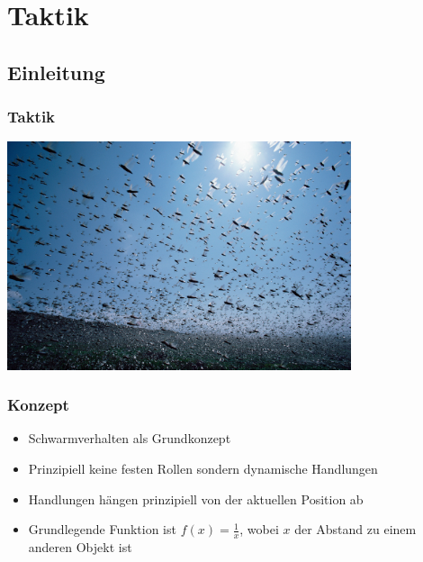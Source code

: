 \section{Taktik}
\begin{frame}
\tableofcontents[currentsection]
\end{frame}

\subsection{Einleitung}
\frame
{\frametitle{Taktik}
\begin{center}\includegraphics[height=6.7cm, center]{Invasion.jpg}\end{center}
}
\frame
{
  \frametitle{Konzept}
  \begin{itemize}
    \item Schwarmverhalten als Grundkonzept
    \item Prinzipiell keine festen Rollen sondern dynamische Handlungen
    \item Handlungen hängen prinzipiell von der aktuellen Position ab
    \item Grundlegende Funktion ist $f(x) = \frac 1 x$, wobei $x$ der Abstand zu einem anderen Objekt ist
  \end{itemize}
}

